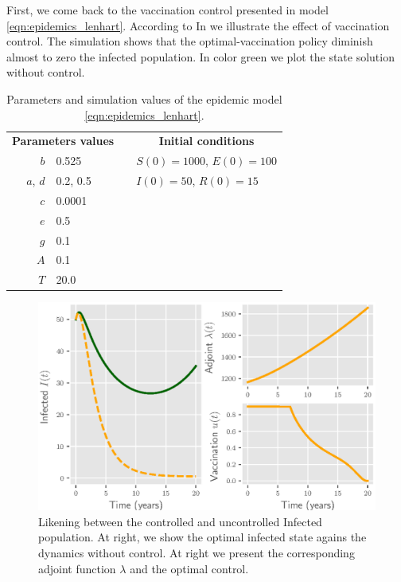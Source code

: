 First, we come back to the vaccination control presented in model
\eqref{eqn:epidemics_lenhart}. According to 
In  we illustrate the effect of vaccination 
control. The simulation shows that the optimal-vaccination policy diminish
almost to zero the infected population. In color green we plot the state 
solution without control.
\begin{table}[htb]
  \begin{center}
    \begin{tabular}{rlll}
      \toprule
      \multicolumn{2}{c}{
            \textbf{Parameters values}
         }
        && \multicolumn{1}{c}{
          \textbf{Initial conditions}
        }
        \\
        \cmidrule{1-2}
        \cmidrule{4-4}
        $b$
          & \num{0.525}
          &&
          $S(0) = \num{1000}$, $E(0) = \num{100}$
        \\
        $a$, $d$ 
          & \num{0.2}, \num{0.5}
          &&
          $I(0) = \num{50}$, $R(0) = \num{15}$
        \\
        $c$
          & \num{0.0001}
        \\
        $e$
          & \num{0.5}
        \\
        $g$
          & \num{0.1}
        \\
        $A$
          & \num{0.1}
        \\
        $T$
          & \num{20.0}
        \\
      \bottomrule
    \end{tabular}
    \caption{Parameters and simulation values of the epidemic model
      \eqref{eqn:epidemics_lenhart}.}
    \label{tbl:epidemics_lenhart}
  \end{center}
\end{table}

\begin{figure}[htb!]
\centering
	\includegraphics{./Figures/epidemics_lenhart_lab7}
	\caption{Likening between the controlled and uncontrolled Infected 
	 population.  At right, we show the optimal infected state agains the 
	 dynamics without 
	 control. At right we present the corresponding adjoint function $\lambda$ 
	 and the optimal control.}
\label{fig:epidemicslenhartlab7}
\end{figure}
